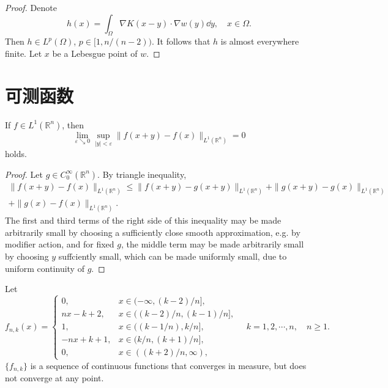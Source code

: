 \begin{proof}
  Denote 
  \[
  h(x) = \int_\Omega \nabla K(x-y) \cdot\nabla w(y)\dd y,\quad x\in\Omega.
  \]
  Then $h\in L^{p}(\Omega)$, $p\in[1,n/(n-2))$.
  It follows that $h$ is almost everywhere finite.
  Let $x$ be a Lebesgue point of $w$.
\end{proof}

\section{可测函数}

\begin{proposition}\label{prop: uniform continuity of integrable function}
  If $f\in L^1(\mathbb R^n)$, then 
  \[
  \lim_{\varepsilon\searrow0}\sup_{|y|<\varepsilon}\|f(x+y)-f(x)\|_{L^1(\mathbb R^n)} = 0
  \]
  holds.
\end{proposition}

\begin{proof}
  Let $g\in C^\infty_0(\mathbb R^n)$. 
  By triangle inequality,
  \begin{align*}
		\|f(x+y)-f(x)\|_{L^1(\mathbb R^n)} 
		\leq \|f(x+y)-g(x+y)\|_{L^1(\mathbb R^n)} 
		+ \|g(x+y)-g(x)\|_{L^1(\mathbb R^n)}\\
		+ \|g(x)-f(x)\|_{L^1(\mathbb R^n)}.
	\end{align*}
  The first and third terms of the right side of this inequality may be made arbitrarily small 
  by choosing a sufficiently close smooth approximation, e.g. by modifier action, 
  and for fixed $g$, the middle term may be made arbitrarily small by choosing $y$ suffciently small,
  which can be made uniformly small, due to uniform continuity of $g$.
\end{proof}

\begin{example}
  Let 
  \begin{equation}
    f_{n,k}(x) = 
    \begin{cases}
      0, & x\in(-\infty, (k-2)/n],\\
      nx-k+2,& x\in((k-2)/n, (k-1)/n],\\
      1,& x\in((k-1/n), k/n],\\
      -nx+k+1, & x\in(k/n, (k+1)/n],\\
      0, & x\in((k+2)/n, \infty),
    \end{cases}
    \quad k = 1,2,\cdots,n, \quad n\geq1.
  \end{equation}
  $\{f_{n,k}\}$ is a sequence of continuous functions that converges in measure, 
  but does not converge at any point.
\end{example}

